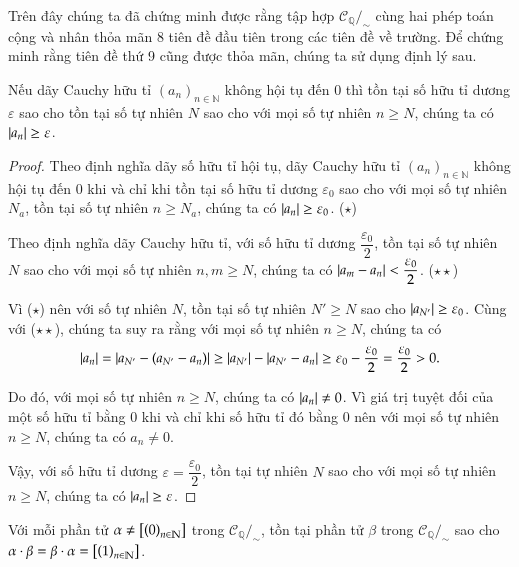 Trên đây chúng ta đã chứng minh được rằng tập hợp $\mathscr{C}_{\mathbb{Q}}/_{\sim}$ cùng hai phép toán cộng và nhân thỏa mãn 8 tiên đề đầu tiên trong các tiên đề về trường. Để chứng minh rằng tiên đề thứ 9 cũng được thỏa mãn, chúng ta sử dụng định lý sau.
\begin{appendixthm}\label{appendixthm:nonzero-cauchy-sequences}
    Nếu dãy Cauchy hữu tỉ ${(a_{n})}_{n\in\mathbb{N}}$ không hội tụ đến $0$ thì tồn tại số hữu tỉ dương $\varepsilon$ sao cho tồn tại số tự nhiên $N$ sao cho với mọi số tự nhiên $n\geq N$, chúng ta có $\left\vert{a_{n}}\right\vert\geq \varepsilon$.
\end{appendixthm}

\begin{proof}
    Theo định nghĩa dãy số hữu tỉ hội tụ, dãy Cauchy hữu tỉ ${(a_{n})}_{n\in\mathbb{N}}$ không hội tụ đến $0$ khi và chỉ khi tồn tại số hữu tỉ dương $\varepsilon_{0}$ sao cho với mọi số tự nhiên $N_{a}$, tồn tại số tự nhiên $n\geq N_{a}$, chúng ta có $\left\vert{a_{n}}\right\vert \geq \varepsilon_{0}$. ($\star$)

    Theo định nghĩa dãy Cauchy hữu tỉ, với số hữu tỉ dương $\dfrac{\varepsilon_{0}}{2}$, tồn tại số tự nhiên $N$ sao cho với mọi số tự nhiên $n, m\geq N$, chúng ta có $\left\vert{a_{m} - a_{n}}\right\vert < \dfrac{\varepsilon_{0}}{2}$. ($\star\star$)

    Vì ($\star$) nên với số tự nhiên $N$, tồn tại số tự nhiên $N'\geq N$ sao cho $\left\vert{a_{N'}}\right\vert \geq \varepsilon_{0}$. Cùng với ($\star\star$), chúng ta suy ra rằng với mọi số tự nhiên $n\geq N$, chúng ta có
    \[
        \left\vert{a_{n}}\right\vert = \left\vert{a_{N'} - (a_{N'} - a_{n})}\right\vert \geq \left\vert{a_{N'}}\right\vert - \left\vert{a_{N'} - a_{n}}\right\vert \geq \varepsilon_{0} - \frac{\varepsilon_{0}}{2} = \frac{\varepsilon_{0}}{2} > 0.
    \]

    Do đó, với mọi số tự nhiên $n\geq N$, chúng ta có $\left\vert{a_{n}}\right\vert\ne 0$. Vì giá trị tuyệt đối của một số hữu tỉ bằng $0$ khi và chỉ khi số hữu tỉ đó bằng $0$ nên với mọi số tự nhiên $n\geq N$, chúng ta có $a_{n}\ne 0$.

    Vậy, với số hữu tỉ dương $\varepsilon = \dfrac{\varepsilon_{0}}{2}$, tồn tại tự nhiên $N$ sao cho với mọi số tự nhiên $n\geq N$, chúng ta có $\left\vert{a_{n}}\right\vert\geq \varepsilon$.
\end{proof}

\begin{appendixthm}
    Với mỗi phần tử $\alpha\ne \left[{\left({0}\right)}_{{n}\in\mathbb{N}}\right]$ trong $\mathscr{C}_{\mathbb{Q}}/_{\sim}$, tồn tại phần tử $\beta$ trong $\mathscr{C}_{\mathbb{Q}}/_{\sim}$ sao cho $\alpha\cdot\beta = \beta\cdot\alpha = \left[{\left({1}\right)}_{{n}\in\mathbb{N}}\right]$.
\end{appendixthm}

